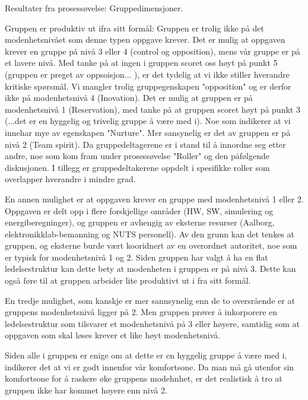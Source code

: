 Resultater fra prosessøvelse: Gruppedimensjoner.

Gruppen er produktiv ut ifra sitt formål: Gruppen er trolig ikke på det modenhetsnivået som denne typen oppgave krever. Det er mulig at oppgaven krever en gruppe på nivå 3 eller 4 (control og opposition), mens vår gruppe er på et lavere nivå. Med tanke på at ingen i gruppen scoret oss høyt på punkt 5 (gruppen er preget av oppsoisjon... ), er det tydelig at vi ikke stiller hverandre kritiske spørsmål. Vi mangler trolig gruppegenskapen "opposition" og er derfor ikke på modenhetsnivå 4 (Inovation). 
	Det er mulig at gruppen er på modenhetsnivå 1 (Reservation), med tanke på at gruppen scoret høyt på punkt 3 (...det er en hyggelig og trivelig gruppe å være med i). Noe som indikerer at vi innehar mye av egenskapen "Nurture". Mer sansynelig er det av gruppen er på nivå 2 (Team spirit). Da gruppedeltagerene er i stand til å innordne seg etter andre, noe som kom fram under prosessøvelse "Roller" og den påfølgende diskusjonen. I tillegg er gruppedeltakerene oppdelt i spesifikke roller som overlapper hverandre i mindre grad.    
 
	
En annen mulighet er at oppgaven krever en gruppe med modenhetsnivå 1 eller 2. Oppgaven er delt opp i flere forskjellige områder (HW, SW, simulering og energiberegninger), og gruppen er avhengig av eksterne resurser (Aalborg, elektronikklab-bemanning og NUTS personell). Av den grunn kan det tenkes at gruppen, og eksterne burde vært kooridnert av en overordnet autoritet, noe som er typisk for modenhetsnivå 1 og 2. 
	Siden gruppen har valgt å ha en flat ledelsestruktur kan dette bety at modenheten i gruppen er på nivå 3. Dette kan også føre til at gruppen arbeider lite produktivt ut i fra sitt formål.
	
	 
En tredje mulighet, som kanskje er mer sannsynelig enn de to oversrående er at gruppens modenhetsnivå ligger på 2. Men gruppen prøver å inkorporere en ledelsestruktur som tilsvarer et modenhetsnivå på 3 eller høyere, samtidig som at oppgaven som skal løses krever et like høyt modenhetsnivå. 

Siden alle i gruppen er enige om at dette er en hyggelig gruppe å være med i, indikerer det at vi er godt innenfor vår komfortsone. Da man må gå utenfor sin komfortsone for å raskere øke gruppens modehnhet, er det realistisk å tro at gruppen ikke har kommet høyere enn nivå 2. 